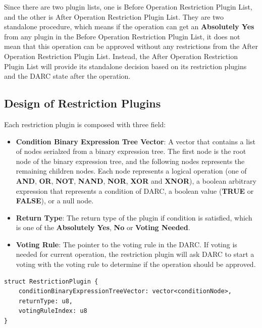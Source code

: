\documentclass[main.tex]{subfiles}
\begin{document}
Since there are two plugin lists, one is Before Operation Restriction Plugin List, and the other is After Operation Restriction Plugin List. They are two standalone procedure, which means if the operation can get an \textbf{Absolutely Yes} from any plugin in the Before Operation Restriction Plugin List, it does not mean that this operation can be approved without any restrictions from the After Operation Restriction Plugin List. Instead, the After Operation Restriction Plugin List will provide its standalone decision based on its restriction plugins and the DARC state after the operation.

\subsection{Design of Restriction Plugins}

Each restriction plugin is composed with three field: 

\begin{itemize}
    \item \textbf{Condition Binary Expression Tree Vector}: A vector that contains a list of nodes serialzed from a binary expression tree. The first node is the root node of the binary expression tree, and the following nodes represents the remaining children nodes. Each node represents a logical operation (one of \textbf{AND}, \textbf{OR}, \textbf{NOT}, \textbf{NAND}, \textbf{NOR}, \textbf{XOR} and \textbf{XNOR}), a boolean arbitrary expression that represents a condition of DARC, a boolean value (\textbf{TRUE} or \textbf{FALSE}), or a null node.
    \item \textbf{Return Type}: The return type of the plugin if condition is satisfied, which is one of the \textbf{Absolutely Yes}, \textbf{No} or \textbf{Voting Needed}.
    \item \textbf{Voting Rule}: The pointer to the voting rule in the DARC. If voting is needed for current operation, the restriction plugin will ask DARC to start a voting with the voting rule to determine if the operation should be approved.
\end{itemize}

\begin{lstlisting}
struct RestrictionPlugin {  
    conditionBinaryExpressionTreeVector: vector<conditionNode>,
    returnType: u8,
    votingRuleIndex: u8
}
\end{lstlisting}
\end{document}
